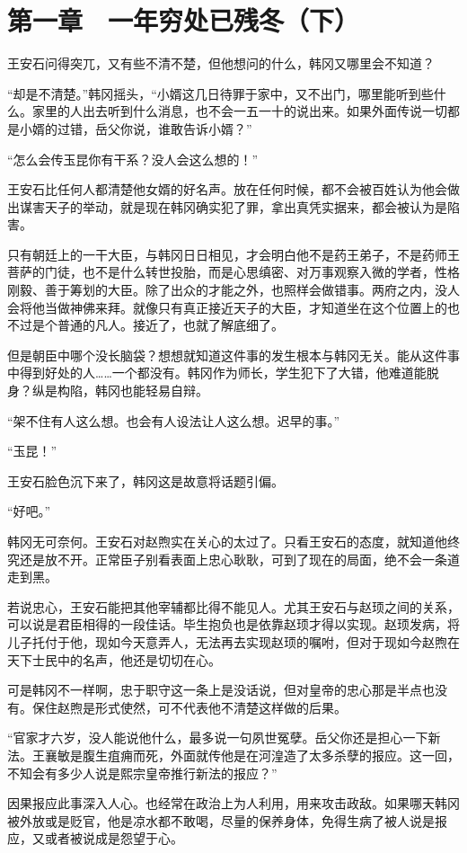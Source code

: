 \section{第一章　一年穷处已残冬（下）}
王安石问得突兀，又有些不清不楚，但他想问的什么，韩冈又哪里会不知道？

“却是不清楚。”韩冈摇头，“小婿这几日待罪于家中，又不出门，哪里能听到些什么。家里的人出去听到什么消息，也不会一五一十的说出来。如果外面传说一切都是小婿的过错，岳父你说，谁敢告诉小婿？”

“怎么会传玉昆你有干系？没人会这么想的！”

王安石比任何人都清楚他女婿的好名声。放在任何时候，都不会被百姓认为他会做出谋害天子的举动，就是现在韩冈确实犯了罪，拿出真凭实据来，都会被认为是陷害。

只有朝廷上的一干大臣，与韩冈日日相见，才会明白他不是药王弟子，不是药师王菩萨的门徒，也不是什么转世投胎，而是心思缜密、对万事观察入微的学者，性格刚毅、善于筹划的大臣。除了出众的才能之外，也照样会做错事。两府之内，没人会将他当做神佛来拜。就像只有真正接近天子的大臣，才知道坐在这个位置上的也不过是个普通的凡人。接近了，也就了解底细了。

但是朝臣中哪个没长脑袋？想想就知道这件事的发生根本与韩冈无关。能从这件事中得到好处的人……一个都没有。韩冈作为师长，学生犯下了大错，他难道能脱身？纵是构陷，韩冈也能轻易自辩。

“架不住有人这么想。也会有人设法让人这么想。迟早的事。”

“玉昆！”

王安石脸色沉下来了，韩冈这是故意将话题引偏。

“好吧。”

韩冈无可奈何。王安石对赵煦实在关心的太过了。只看王安石的态度，就知道他终究还是放不开。正常臣子别看表面上忠心耿耿，可到了现在的局面，绝不会一条道走到黑。

若说忠心，王安石能把其他宰辅都比得不能见人。尤其王安石与赵顼之间的关系，可以说是君臣相得的一段佳话。毕生抱负也是依靠赵顼才得以实现。赵顼发病，将儿子托付于他，现如今天意弄人，无法再去实现赵顼的嘱咐，但对于现如今赵煦在天下士民中的名声，他还是切切在心。

可是韩冈不一样啊，忠于职守这一条上是没话说，但对皇帝的忠心那是半点也没有。保住赵煦是形式使然，可不代表他不清楚这样做的后果。

“官家才六岁，没人能说他什么，最多说一句夙世冤孽。岳父你还是担心一下新法。王襄敏是腹生疽痈而死，外面就传他是在河湟造了太多杀孽的报应。这一回，不知会有多少人说是熙宗皇帝推行新法的报应？”

因果报应此事深入人心。也经常在政治上为人利用，用来攻击政敌。如果哪天韩冈被外放或是贬官，他是凉水都不敢喝，尽量的保养身体，免得生病了被人说是报应，又或者被说成是怨望于心。

